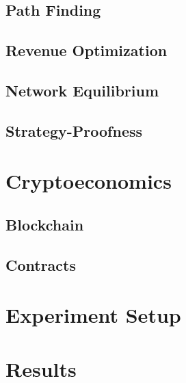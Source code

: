 \documentclass[preprint,twoside,11pt]{article}
\begin{document}
\subsection{Path Finding}

\subsection{Revenue Optimization}

\subsection{Network Equilibrium}

\subsection{Strategy-Proofness}

\section{Cryptoeconomics}

\subsection{Blockchain}

\subsection{Contracts}

\section{Experiment Setup}

\section{Results}


\newpage

\appendix
\end{document}
